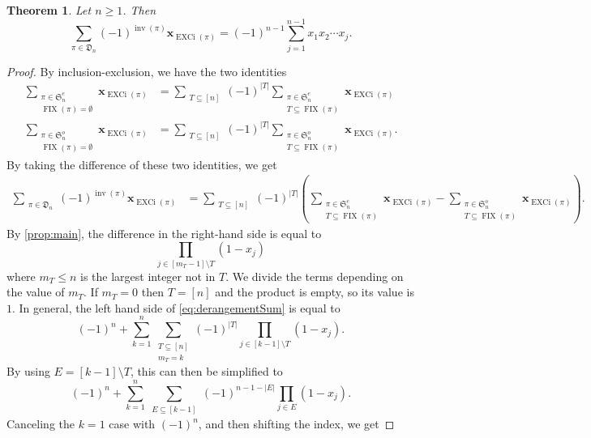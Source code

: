 \documentclass[reqno]{amsart}
\newtheorem{theorem}{Theorem}
\theoremstyle{definition}
\newcommand{\xvec}{\mathbf{x}}
\newcommand{\symS}{\mathfrak{S}}
\newcommand{\dArr}{\mathfrak{D}}
\DeclareMathOperator{\inv}{inv}
\DeclareMathOperator{\FIX}{FIX}
\DeclareMathOperator{\EXCi}{EXCi}
\begin{document}
\begin{theorem}\label{thm:mainGenFunc}
Let $n\geq 1$. Then
\begin{equation}\label{eq:derangementSum}
 \sum_{\pi \in \dArr_n } (-1)^{\inv(\pi)} \xvec_{\EXCi(\pi)} = 
 (-1)^{n-1} \sum_{j=1}^{n-1} x_{1}x_{2}\dotsm x_{j}.
\end{equation}
\end{theorem}
\begin{proof}
By inclusion-exclusion, we have the two identities
\begin{align*}
 \sum_{\substack{\pi \in \symS^e_n \\ \FIX(\pi)=\emptyset}} \xvec_{\EXCi(\pi)}
 &=
 \sum_{\substack{T \subseteq [n]  }}
 (-1)^{|T|} \sum_{\substack{\pi \in  \symS^e_n  \\ T \subseteq \FIX(\pi)   }} \xvec_{\EXCi(\pi)}\\
%
 \sum_{\substack{\pi \in \symS^o_n \\ \FIX(\pi)=\emptyset}} \xvec_{\EXCi(\pi)}
 &=
 \sum_{\substack{T \subseteq [n]   }}
 (-1)^{|T|} \sum_{\substack{\pi \in  \symS^o_n  \\ T \subseteq \FIX(\pi)   }} \xvec_{\EXCi(\pi)}.
\end{align*}
%
%
By taking the difference of these two identities, we get
\begin{align*}
 \sum_{\substack{\pi \in \dArr_n }} (-1)^{\inv(\pi)} \xvec_{\EXCi(\pi)}
 &=
\sum_{\substack{T \subseteq [n] }}
 (-1)^{|T|}
\left( 
 \sum_{\substack{\pi \in  \symS^e_n  \\ T \subseteq \FIX(\pi)   }} \xvec_{\EXCi(\pi)} 
 -
 \sum_{\substack{\pi \in  \symS^o_n  \\ T \subseteq \FIX(\pi)   }} \xvec_{\EXCi(\pi)}
\right). 
\end{align*}
By \cref{prop:main}, the difference in the right-hand side is equal to 
\[
  \prod_{ j \in [m_T-1]\setminus T } (1-x_j)
\]
where $m_T\leq n$ is the largest integer not in $T$.
We divide the terms depending on the value of $m_T$.
If $m_T=0$ then $T=[n]$ and the product is empty, so its value is $1$.
In general, the left hand side of \eqref{eq:derangementSum} is equal to
\[
(-1)^{n} + 
 \sum_{k=1}^n \sum_{\substack{T \subseteq [n] \\ m_T = k}} (-1)^{|T|}
 \prod_{ j \in [k-1]\setminus T } (1-x_j). 
 \]
By using $E = [k-1]\setminus T$, this can then be simplified to
 \[
 (-1)^{n} +
 \sum_{k=1}^n 
 \sum_{\substack{E \subseteq [k-1]}} (-1)^{n-1-|E|}
 \prod_{ j \in E } (1-x_j).
\]
Canceling the $k=1$ case with $(-1)^{n}$, and then shifting the index, we get

\end{proof}
\end{document}
